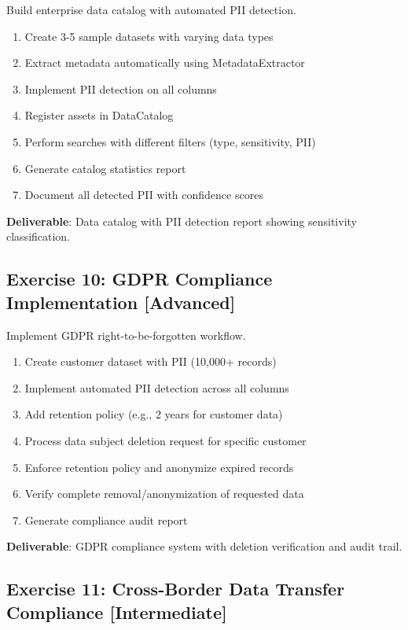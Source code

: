 Build enterprise data catalog with automated PII detection.

\begin{enumerate}
    \item Create 3-5 sample datasets with varying data types
    \item Extract metadata automatically using MetadataExtractor
    \item Implement PII detection on all columns
    \item Register assets in DataCatalog
    \item Perform searches with different filters (type, sensitivity, PII)
    \item Generate catalog statistics report
    \item Document all detected PII with confidence scores
\end{enumerate}

\textbf{Deliverable}: Data catalog with PII detection report showing sensitivity classification.

\subsection{Exercise 10: GDPR Compliance Implementation [Advanced]}

Implement GDPR right-to-be-forgotten workflow.

\begin{enumerate}
    \item Create customer dataset with PII (10,000+ records)
    \item Implement automated PII detection across all columns
    \item Add retention policy (e.g., 2 years for customer data)
    \item Process data subject deletion request for specific customer
    \item Enforce retention policy and anonymize expired records
    \item Verify complete removal/anonymization of requested data
    \item Generate compliance audit report
\end{enumerate}

\textbf{Deliverable}: GDPR compliance system with deletion verification and audit trail.

\subsection{Exercise 11: Cross-Border Data Transfer Compliance [Intermediate]}

